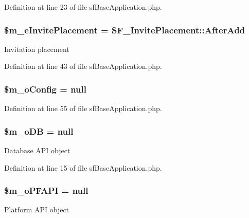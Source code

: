 Definition at line 23 of file sfBaseApplication.php.

\hypertarget{classSFApplication_a78a5b97e38e7a2bc9e36cca0a97a2cca}{
\subsubsection[{\$m\_\-eInvitePlacement}]{\setlength{\rightskip}{0pt plus 5cm}\$m\_\-eInvitePlacement = SF\_\-InvitePlacement::AfterAdd}}
\label{classSFApplication_a78a5b97e38e7a2bc9e36cca0a97a2cca}
Invitation placement 

Definition at line 43 of file sfBaseApplication.php.

\hypertarget{classSFApplication_a0af2b37a09c1015be10cfa60f3f1d1b9}{
\subsubsection[{\$m\_\-oConfig}]{\setlength{\rightskip}{0pt plus 5cm}\$m\_\-oConfig = null}}
\label{classSFApplication_a0af2b37a09c1015be10cfa60f3f1d1b9}


Definition at line 55 of file sfBaseApplication.php.

\hypertarget{classSFApplication_af0fd242fc474881efab473522eec0748}{
\subsubsection[{\$m\_\-oDB}]{\setlength{\rightskip}{0pt plus 5cm}\$m\_\-oDB = null}}
\label{classSFApplication_af0fd242fc474881efab473522eec0748}
Database API object 

Definition at line 15 of file sfBaseApplication.php.

\hypertarget{classSFApplication_a23d5b5190ee32c4eb8fff028844b1fa6}{
\subsubsection[{\$m\_\-oPFAPI}]{\setlength{\rightskip}{0pt plus 5cm}\$m\_\-oPFAPI = null}}
\label{classSFApplication_a23d5b5190ee32c4eb8fff028844b1fa6}
Platform API object 

